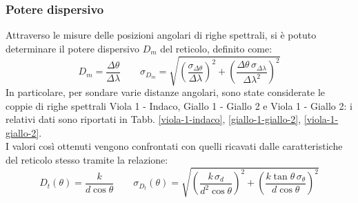 \documentclass[]{article}
\begin{document}
    \subsubsection{Potere dispersivo}
    Attraverso le misure delle posizioni angolari di righe spettrali, si è potuto determinare il potere dispersivo $D_{m}$ del reticolo, definito come:
    \begin{equation}
        \label{D-m}
        D_m = \frac{\Delta \theta}{\Delta \lambda} \qquad \sigma_{D_m} = \sqrt{\left(\frac{\sigma_{\Delta\theta}}{\Delta\lambda}\right)^2 + \left(\frac{\Delta\theta \, \sigma_{\Delta\lambda}}{\Delta\lambda^2}\right)^2}
    \end{equation}
    In particolare, per sondare varie distanze angolari, sono state considerate le coppie di righe spettrali Viola 1 - Indaco, Giallo 1 - Giallo 2 e Viola 1 - Giallo 2: i relativi dati sono riportati in Tabb. \ref{viola-1-indaco}, \ref{giallo-1-giallo-2}, \ref{viola-1-giallo-2}. \\
    I valori così ottenuti vengono confrontati con quelli ricavati dalle caratteristiche del reticolo stesso tramite la relazione:
    \begin{equation}
        \label{D-t}
        D_t(\theta) = \frac{k}{d\cos{\theta}} \qquad \sigma_{D_t}(\theta) = \sqrt{\left(\frac{k \, \sigma_d}{d^2 \cos{\theta}}\right)^2 + \left(\frac{k \tan{\theta} \, \sigma_\theta}{d\cos{\theta}}\right)^2}
    \end{equation}
\end{document}
